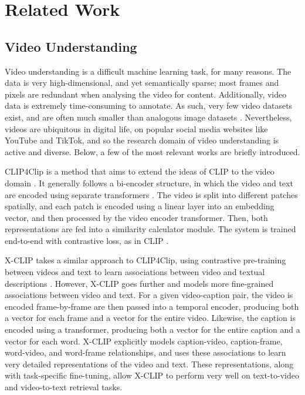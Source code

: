 \section{Related Work}

\subsection{Video Understanding}

Video understanding is a difficult machine learning task, for many reasons.
The data is very high-dimensional, and yet semantically sparse; most frames and pixels are redundant when analysing the video for content.
Additionally, video data is extremely time-consuming to annotate.
As such, very few video datasets exist, and are often much smaller than analogous image datasets \cite{imagenet} \cite{coco}.
Nevertheless, videos are ubiquitous in digital life, on popular social media websites like YouTube and TikTok, and so the research domain of video understanding is active and diverse.
Below, a few of the most relevant works are briefly introduced.

CLIP4Clip is a method that aims to extend the ideas of CLIP \cite{clip} to the video domain \cite{clip4clip}.
It generally follows a bi-encoder structure, in which the video and text are encoded using separate transformers \cite{transformer}.
The video is split into different patches spatially, and each patch is encoded using a linear layer into an embedding vector, and then processed by the video encoder transformer.
Then, both representations are fed into a similarity calculator module.
The system is trained end-to-end with contrastive loss, as in CLIP \cite{clip}.

X-CLIP takes a similar approach to CLIP4Clip, using contrastive pre-training between videos and text to learn associations between video and textual descriptions \cite{xclip}.
However, X-CLIP goes further and models more fine-grained associations between video and text.
For a given video-caption pair, the video is encoded frame-by-frame are then passed into a temporal encoder, producing both a vector for each frame and a vector for the entire video.
Likewise, the caption is encoded using a transformer, producing both a vector for the entire caption and a vector for each word.
X-CLIP explicitly models caption-video, caption-frame, word-video, and word-frame relationships, and uses these associations to learn very detailed representations of the video and text.
These representations, along with task-specific fine-tuning, allow X-CLIP to perform very well on text-to-video and video-to-text retrieval tasks.


